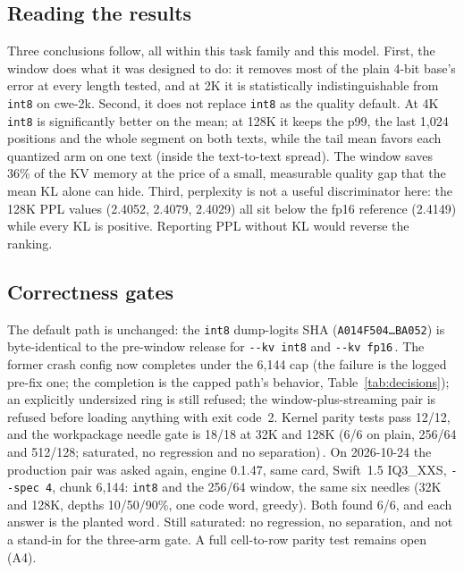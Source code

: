 \documentclass[10pt,twocolumn]{article}
\begin{document}
\subsection{Reading the results}

Three conclusions follow, all within this task family and this model. First, the window does what it was designed to do: it removes most of the plain 4-bit base's error at every length tested, and at 2K it is statistically indistinguishable from \texttt{int8} on cwe-2k. Second, it does not replace \texttt{int8} as the quality default. At 4K \texttt{int8} is significantly better on the mean; at 128K it keeps the p99, the last 1,024 positions and the whole segment on both texts, while the tail mean favors each quantized arm on one text (inside the text-to-text spread). The window saves 36\% of the KV memory at the price of a small, measurable quality gap that the mean KL alone can hide. Third, perplexity is not a useful discriminator here: the 128K PPL values (2.4052, 2.4079, 2.4029) all sit below the fp16 reference (2.4149) while every KL is positive. Reporting PPL without KL would reverse the ranking.

\subsection{Correctness gates}

The default path is unchanged: the \texttt{int8} dump-logits SHA (\texttt{A014F504\ldots BA052}) is byte-identical to the pre-window release for \texttt{-{}-kv int8} and \texttt{-{}-kv fp16}\,\cite{strata-details}. The former crash config now completes under the 6,144 cap (the failure is the logged pre-fix one; the completion is the capped path's behavior, Table~\ref{tab:decisions}); an explicitly undersized ring is still refused; the window-plus-streaming pair is refused before loading anything with exit code~2. Kernel parity tests pass 12/12, and the workpackage needle gate is 18/18 at 32K and 128K (6/6 on plain, 256/64 and 512/128; saturated, no regression and no separation)\,\cite{strata-wp}. On 2026-10-24 the production pair was asked again, engine 0.1.47, same card, Swift~1.5 IQ3\_XXS, \texttt{-{}-spec 4}, chunk 6,144: \texttt{int8} and the 256/64 window, the same six needles (32K and 128K, depths 10/50/90\%, one code word, greedy). Both found 6/6, and each answer is the planted word\,\cite{strata-needle24}. Still saturated: no regression, no separation, and not a stand-in for the three-arm gate. A full cell-to-row parity test remains open (A4).
\end{document}
